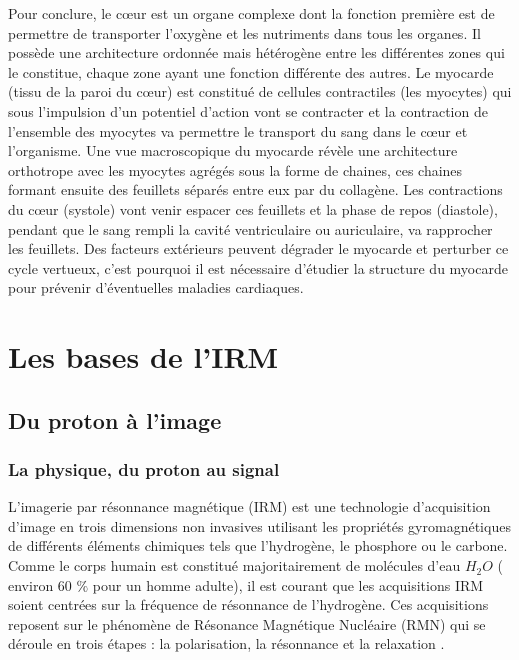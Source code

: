 Pour conclure, le cœur est un organe complexe dont la fonction première est de permettre de transporter l’oxygène et les nutriments dans tous les organes. Il possède une architecture ordonnée mais hétérogène entre les différentes zones qui le constitue, chaque zone ayant une fonction différente des autres. Le myocarde (tissu de la paroi du cœur) est constitué de cellules contractiles (les myocytes) qui sous l’impulsion d’un potentiel d’action vont se contracter et la contraction de l’ensemble des myocytes va permettre le transport du sang dans le cœur et l’organisme. Une vue macroscopique du myocarde révèle une architecture orthotrope avec les myocytes agrégés sous la forme de chaines, ces chaines formant ensuite des feuillets séparés entre eux par du collagène. Les contractions du cœur (systole) vont venir espacer ces feuillets et la phase de repos (diastole), pendant que le sang rempli la cavité ventriculaire ou auriculaire, va rapprocher les feuillets. Des facteurs extérieurs peuvent dégrader le myocarde et perturber ce cycle vertueux, c’est pourquoi il est nécessaire d’étudier la structure du myocarde pour prévenir d’éventuelles maladies cardiaques. 


\section{Les bases de l'IRM}
\subsection{Du proton à l’image}
\subsubsection{La physique, du proton au signal}

L’imagerie par résonnance magnétique (IRM) est une technologie d’acquisition d’image en trois dimensions non invasives utilisant les propriétés gyromagnétiques de différents éléments chimiques tels que l’hydrogène, le phosphore ou le carbone. Comme le corps humain est constitué majoritairement de molécules d’eau $H_2O$ ( environ 60 $\%$ pour un homme adulte), il est courant que les acquisitions IRM soient centrées sur la fréquence de résonnance de l’hydrogène. Ces acquisitions reposent sur le phénomène de Résonance Magnétique Nucléaire (RMN) qui se déroule en trois étapes : la polarisation, la résonnance et la relaxation \cite{HolgerFrsterling2009}.

